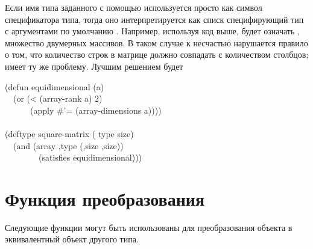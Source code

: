 \begin{defmac}
Если имя типа заданного с помощью  используется просто как символ
спецификатора типа, тогда оно интерпретируется как списк специфирующий тип с
аргументами по умолчанию \cdf{*}. Например, используя код выше,
 будет означать , множество двумерных
массивов.
В таком случае к несчастью нарушается правило о том, что количество строк в
матрице должно совпадать с количеством столбцов;  имеет
ту же проблему.
Лучшим решением будет
\begin{lisp}
(defun equidimensional (a) \\
~~(or (< (array-rank a) 2) \\
~~~~~~(apply \#'= (array-dimensions a)))) \\
 \\
(deftype square-matrix ( type size) \\
~~{\Xbq}(and (array ,type (,size ,size)) \\
~~~~~~~~(satisfies equidimensional)))
\end{lisp}

\end{defmac}

\section{Функция преобразования}

Следующие функции могут быть использованы для преобразования объекта в
эквивалентный объект другого типа.

